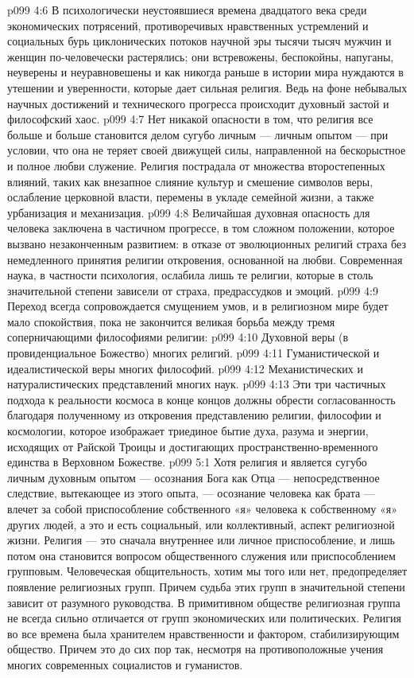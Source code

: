 \vs p099 4:6 \pc В психологически неустоявшиеся времена двадцатого века среди экономических потрясений, противоречивых нравственных устремлений и социальных бурь циклонических потоков научной эры тысячи тысяч мужчин и женщин по\hyp{}человечески растерялись; они встревожены, беспокойны, напуганы, неуверены и неуравновешены и как никогда раньше в истории мира нуждаются в утешении и уверенности, которые дает сильная религия. Ведь на фоне небывалых научных достижений и технического прогресса происходит духовный застой и философский хаос.
\vs p099 4:7 \pc Нет никакой опасности в том, что религия все больше и больше становится делом сугубо личным --- личным опытом --- при условии, что она не теряет своей движущей силы, направленной на бескорыстное и полное любви служение. Религия пострадала от множества второстепенных влияний, таких как внезапное слияние культур и смешение символов веры, ослабление церковной власти, перемены в укладе семейной жизни, а также урбанизация и механизация.
\vs p099 4:8 Величайшая духовная опасность для человека заключена в частичном прогрессе, в том сложном положении, которое вызвано незаконченным развитием: в отказе от эволюционных религий страха без немедленного принятия религии откровения, основанной на любви. Современная наука, в частности психология, ослабила лишь те религии, которые в столь значительной степени зависели от страха, предрассудков и эмоций.
\vs p099 4:9 Переход всегда сопровождается смущением умов, и в религиозном мире будет мало спокойствия, пока не закончится великая борьба между тремя соперничающими философиями религии:
\vs p099 4:10 \bibnobreakspace Духовной веры (в провиденциальное Божество) многих религий.
\vs p099 4:11 \bibnobreakspace Гуманистической и идеалистической веры многих философий.
\vs p099 4:12 \bibnobreakspace Механистических и натуралистических представлений многих наук.
\vs p099 4:13 \pc Эти три частичных подхода к реальности космоса в конце концов должны обрести согласованность благодаря полученному из откровения представлению религии, философии и космологии, которое изображает триединое бытие духа, разума и энергии, исходящих от Райской Троицы и достигающих пространственно\hyp{}временного единства в Верховном Божестве.
\vs p099 5:1 Хотя религия и является сугубо личным духовным опытом --- осознания Бога как Отца --- непосредственное следствие, вытекающее из этого опыта, --- осознание человека как брата --- влечет за собой приспособление собственного «я» человека к собственному «я» других людей, а это и есть социальный, или коллективный, аспект религиозной жизни. Религия --- это сначала внутреннее или личное приспособление, и лишь потом она становится вопросом общественного служения или приспособлением групповым. Человеческая общительность, хотим мы того или нет, предопределяет появление религиозных групп. Причем судьба этих групп в значительной степени зависит от разумного руководства. В примитивном обществе религиозная группа не всегда сильно отличается от групп экономических или политических. Религия во все времена была хранителем нравственности и фактором, стабилизирующим общество. Причем это до сих пор так, несмотря на противоположные учения многих современных социалистов и гуманистов.
